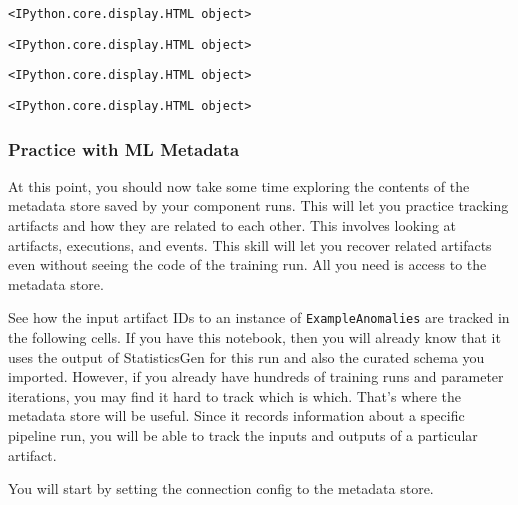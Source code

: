 \documentclass[11pt]{article}
\begin{document}
    \begin{Verbatim}[commandchars=\\\{\}]
<IPython.core.display.HTML object>
    \end{Verbatim}

    
    
    \begin{Verbatim}[commandchars=\\\{\}]
<IPython.core.display.HTML object>
    \end{Verbatim}

    
    
    \begin{Verbatim}[commandchars=\\\{\}]
<IPython.core.display.HTML object>
    \end{Verbatim}

    
    
    \begin{Verbatim}[commandchars=\\\{\}]
<IPython.core.display.HTML object>
    \end{Verbatim}

    
    \hypertarget{practice-with-ml-metadata}{%
\subsubsection{Practice with ML
Metadata}\label{practice-with-ml-metadata}}

At this point, you should now take some time exploring the contents of
the metadata store saved by your component runs. This will let you
practice tracking artifacts and how they are related to each other. This
involves looking at artifacts, executions, and events. This skill will
let you recover related artifacts even without seeing the code of the
training run. All you need is access to the metadata store.

See how the input artifact IDs to an instance of
\texttt{ExampleAnomalies} are tracked in the following cells. If you
have this notebook, then you will already know that it uses the output
of StatisticsGen for this run and also the curated schema you imported.
However, if you already have hundreds of training runs and parameter
iterations, you may find it hard to track which is which. That's where
the metadata store will be useful. Since it records information about a
specific pipeline run, you will be able to track the inputs and outputs
of a particular artifact.

You will start by setting the connection config to the metadata store.
\end{document}
